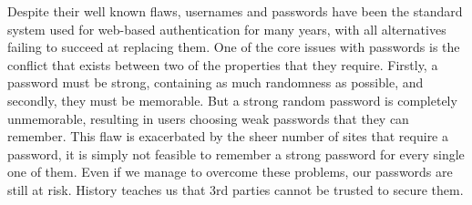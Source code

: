 Despite their well known flaws, usernames and passwords have been the standard system used for web-based authentication for many years, with all alternatives failing to succeed at replacing them. One of the core issues with passwords is the conflict that exists between two of the properties that they require. Firstly, a password must be strong, containing as much randomness as possible, and secondly, they must be memorable. But a strong random password is completely unmemorable, resulting in users choosing weak passwords that they can remember. This flaw is exacerbated by the sheer number of sites that require a password, it is simply not feasible to remember a strong password for every single one of them. Even if we manage to overcome these problems, our passwords are still at risk. History teaches us that 3rd parties cannot be trusted to secure them.
